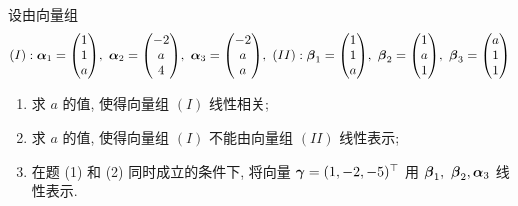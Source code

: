 \begin{example}[2016 南京航空航天大学]
    设由向量组 $$(I):\vb*{\alpha}_1=\mqty(1\\1\\a),~\vb*{\alpha}_2=\mqty(-2\\a\\4),~\vb*{\alpha}_3=\mqty(-2\\a\\a),~(II):\vb*{\beta}_1=\mqty(1\\1\\a),~\vb*{\beta}_2=\mqty(1\\a\\1),~\vb*{\beta}_3=\mqty(a\\1\\1)$$
    \begin{enumerate}[label=(\arabic{*})]
        \item 求 $a$ 的值, 使得向量组 $(I)$ 线性相关;
        \item 求 $a$ 的值, 使得向量组 $(I)$ 不能由向量组 $(II)$ 线性表示;
        \item 在题 (1) 和 (2) 同时成立的条件下, 将向量 $\vb*{\gamma}=(1,-2,-5)^\top$ 用 $\vb*{\beta}_1,~\vb*{\beta}_2,\vb*{\alpha}_3$ 线性表示.
    \end{enumerate}
\end{example}
